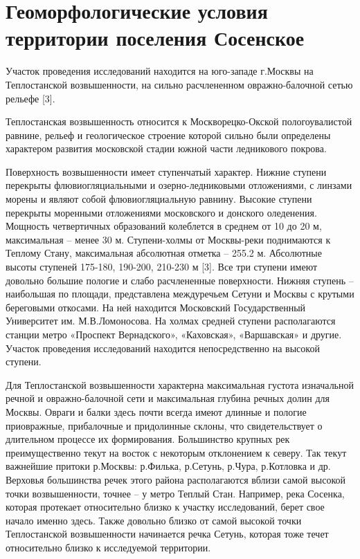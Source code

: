 \chapter*{Геоморфологические условия территории поселения Сосенское} 

Участок проведения исследований находится на юго-западе г.Москвы на Теплостанской возвышенности, на сильно расчлененном овражно-балочной сетью рельефе [3]. 

Теплостанская возвышенность относится к Москворецко-Окской пологоувалистой равнине, рельеф 
и геологическое строение которой сильно были определены характером развития московской стадии южной части ледникового покрова. 

Поверхность возвышенности имеет ступенчатый характер. Нижние ступени перекрыты флювиогляциальными 
и озерно-ледниковыми отложениями, с линзами морены и являют собой флювиогляциальную равнину. 
Высокие ступени перекрыты моренными отложениями московского и донского оледенения. 
Мощность четвертичных образований колеблется в среднем от 10 до 20 м, максимальная – менее 30 м. 
Ступени-холмы от Москвы-реки поднимаются к Теплому Стану, максимальная абсолютная отметка – 255.2 м. 
Абсолютные высоты ступеней 175-180, 190-200, 210-230 м [3]. Все три ступени имеют довольно большие пологие 
и слабо расчлененные поверхности. Нижняя ступень – наибольшая по площади, представлена междуречьем Сетуни 
и Москвы с крутыми береговыми откосами. На ней находится Московский Государственный Университет им. М.В.Ломоносова. 
На холмах средней ступени располагаются станции метро «Проспект Вернадского», «Каховская», «Варшавская» и другие. 
Участок проведения исследований находится непосредственно на высокой ступени. 

Для Теплостанской возвышенности характерна максимальная густота изначальной речной 
и овражно-балочной сети и максимальная глубина речных долин для Москвы. 
Овраги и балки здесь почти всегда имеют длинные и пологие приовражные, прибалочные и придолинные склоны, 
что свидетельствует о длительном процессе их формирования. Большинство крупных рек преимущественно текут 
на восток с некоторым отклонением к северу. Так текут важнейшие притоки р.Москвы: 
р.Филька, р.Сетунь, р.Чура, р.Котловка и др. 
Верховья большинства речек этого района располагаются вблизи самой высокой точки возвышенности, 
точнее – у метро Теплый Стан. Например, река Сосенка, которая протекает относительно близко к участку исследований, 
берет свое начало именно здесь. Также довольно близко от самой высокой точки 
Теплостанской возвышенности начинается речка Сетунь, которая тоже течет относительно близко к исследуемой территории.